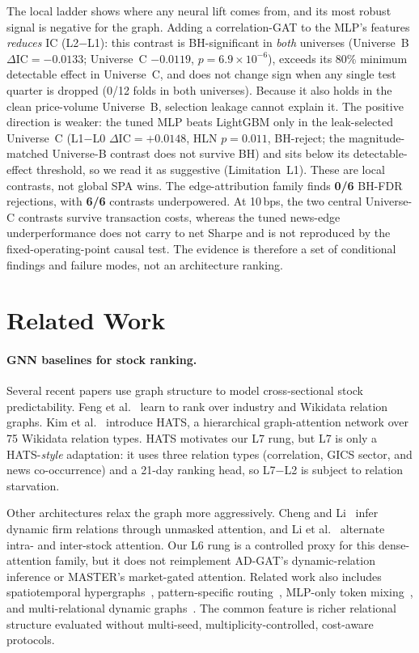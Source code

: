 \documentclass[sigconf,nonacm]{acmart}
\begin{document}
The local ladder shows where any neural lift comes from, and its most robust signal is negative for the graph. Adding a correlation-GAT to the MLP's features \emph{reduces} IC (L2$-$L1): this contrast is BH-significant in \emph{both} universes (Universe~B $\Delta$IC${}=-0.0133$; Universe~C $-0.0119$, $p=6.9\times10^{-6}$), exceeds its 80\% minimum detectable effect in Universe~C, and does not change sign when any single test quarter is dropped (0/12 folds in both universes). Because it also holds in the clean price-volume Universe~B, selection leakage cannot explain it. The positive direction is weaker: the tuned MLP beats LightGBM only in the leak-selected Universe~C (L1$-$L0 $\Delta$IC${}=+0.0148$, HLN $p=0.011$, BH-reject; the magnitude-matched Universe-B contrast does not survive BH) and sits below its detectable-effect threshold, so we read it as suggestive (Limitation~L1). These are local contrasts, not global SPA wins. The edge-attribution family finds \textbf{0/6} BH-FDR rejections, with \textbf{6/6} contrasts underpowered. At 10\,bps, the two central Universe-C contrasts survive transaction costs, whereas the tuned news-edge underperformance does not carry to net Sharpe and is not reproduced by the fixed-operating-point causal test. The evidence is therefore a set of conditional findings and failure modes, not an architecture ranking.

\section{Related Work}\label{sec:related}

\paragraph{GNN baselines for stock ranking.} Several recent papers use graph structure to model cross-sectional stock predictability. Feng et al.~\cite{feng2019temporal} learn to rank over industry and Wikidata relation graphs. Kim et al.~\cite{kim2019hats} introduce HATS, a hierarchical graph-attention network over 75 Wikidata relation types. HATS motivates our L7 rung, but L7 is only a HATS-\emph{style} adaptation: it uses three relation types (correlation, GICS sector, and news co-occurrence) and a 21-day ranking head, so L7$-$L2 is subject to relation starvation.

Other architectures relax the graph more aggressively. Cheng and Li~\cite{cheng2021adgat} infer dynamic firm relations through unmasked attention, and Li et al.~\cite{li2024master} alternate intra- and inter-stock attention. Our L6 rung is a controlled proxy for this dense-attention family, but it does not reimplement AD-GAT's dynamic-relation inference or MASTER's market-gated attention. Related work also includes spatiotemporal hypergraphs~\cite{sawhney2021sthansr}, pattern-specific routing~\cite{lin2021tra}, MLP-only token mixing~\cite{fan2024stockmixer}, and multi-relational dynamic graphs~\cite{qian2024mdgnn}. The common feature is richer relational structure evaluated without multi-seed, multiplicity-controlled, cost-aware protocols.
\end{document}
